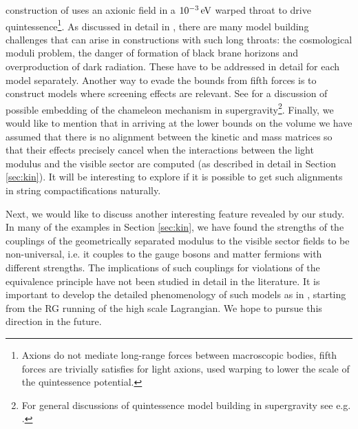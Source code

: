 \documentclass[11pt,a4paper]{article}
\begin{document}
construction of \cite{Panda:2010uq} uses an axionic field in a $10^{-3} \, \rm {eV}$ warped throat to drive quintessence\footnote{Axions do not mediate long-range forces between macroscopic bodies, fifth forces are trivially satisfies for light axions, \cite{Panda:2010uq} used warping to lower the scale of the quintessence potential.}. As discussed in detail in \cite{Panda:2010uq}, there are many model building challenges that can arise in constructions with such long throats: the cosmological moduli problem, the danger of formation of black brane horizons and overproduction of dark radiation. These have to be addressed in detail for each model separately. Another way to evade the bounds from fifth forces is to construct models where  screening effects  \cite{Khoury:2010xi, Vainshtein:1972sx, Brax:2004qh, Brax:2004qh, ArmendarizPicon:2000dh, Hinterbichler:2010es, Martin:2008qp} are relevant. See \cite{Brax:2006np} for a discussion of possible embedding of the chameleon mechanism in supergravity\footnote{For general discussions of quintessence model building in supergravity see e.g. \cite{Brax:1999gp, Copeland:2000vh, Chiang:2018jdg, Kallosh:2002gf}.}.
Finally, we would like to mention that in arriving at the lower bounds on the volume we have assumed that there is no alignment between
the kinetic and mass matrices so that their effects precisely cancel when the interactions between the light modulus and the visible sector 
are computed (as described in detail in Section \ref{sec:kin}). It will be interesting to explore if it is possible to get such alignments in string
compactifications naturally.

Next, we would like to discuss another interesting feature revealed by  our study. In many of the examples in Section \ref{sec:kin}, we have found the strengths of the couplings of the geometrically separated modulus to the visible sector  fields to be non-universal, i.e. it couples to the gauge bosons and matter fermions with  different strengths. The implications of such couplings for violations of the equivalence principle have not been studied in detail in the literature. It is important to develop the detailed phenomenology of such models as in \cite{Kap}, starting from the RG running of the high scale Lagrangian. We hope to pursue this direction in the future.
\end{document}
